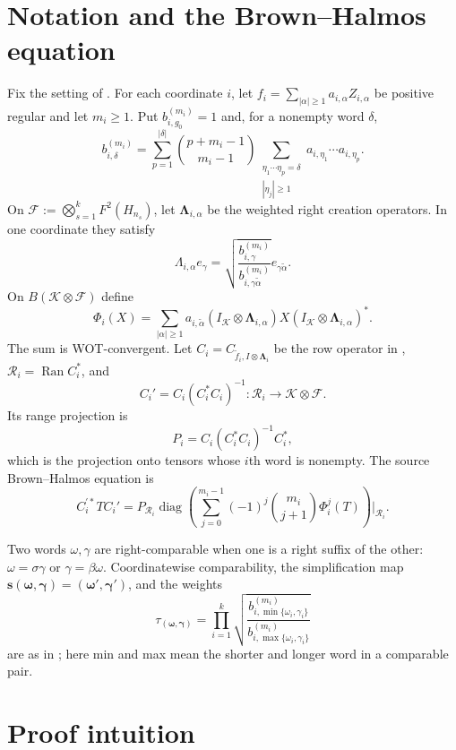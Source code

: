 \documentclass[11pt]{article}
\newcommand{\cK}{\mathcal K}
\newcommand{\cF}{\mathcal F}
\newcommand{\cR}{\mathcal R}
\DeclareMathOperator{\ran}{Ran}
\begin{document}
\section*{Notation and the Brown--Halmos equation}

Fix the setting of \cite[Sections 1 and 4]{Popescu}.  For each coordinate $i$, let
$f_i=\sum_{|\alpha|\geq1}a_{i,\alpha}Z_{i,\alpha}$ be positive regular and let $m_i\geq1$.  Put $b_{i,g_0}^{(m_i)}=1$ and, for a nonempty word $\delta$,
\[
b_{i,\delta}^{(m_i)}
=\sum_{p=1}^{|\delta|}\binom{p+m_i-1}{m_i-1}
  \sum_{\substack{\eta_1\cdots\eta_p=\delta\\ |\eta_j|\geq1}}
  a_{i,\eta_1}\cdots a_{i,\eta_p}.                                 \tag{3}
\]
On $\cF:=\bigotimes_{s=1}^kF^2(H_{n_s})$, let $\boldsymbol\Lambda_{i,\alpha}$ be the weighted right creation operators.  In one coordinate they satisfy
\[
 \Lambda_{i,\alpha}e_\gamma
 =\sqrt{\frac{b_{i,\gamma}^{(m_i)}}
                   {b_{i,\gamma\widetilde\alpha}^{(m_i)}}}
   e_{\gamma\widetilde\alpha}.
\]
On $B(\cK\otimes\cF)$ define
\[
 \Phi_i(X)=\sum_{|\alpha|\geq1}a_{i,\widetilde\alpha}
 (I_{\cK}\otimes\boldsymbol\Lambda_{i,\alpha})X
 (I_{\cK}\otimes\boldsymbol\Lambda_{i,\alpha})^* .                \tag{4}
\]
The sum is WOT-convergent.  Let $C_i=C_{\widetilde f_i,I\otimes\boldsymbol\Lambda_i}$ be the row operator in \cite[Section 4]{Popescu}, $\cR_i=\ran C_i^*$, and
\[
 C_i'=C_i(C_i^*C_i)^{-1}:\cR_i\longrightarrow\cK\otimes\cF.
\]
Its range projection is
\[
 P_i=C_i(C_i^*C_i)^{-1}C_i^*,                                      \tag{5}
\]
which is the projection onto tensors whose $i$th word is nonempty.  The source Brown--Halmos equation is
\[
 C_i^{\prime *}TC_i'
 =P_{\cR_i}\operatorname{diag}
 \left(\sum_{j=0}^{m_i-1}(-1)^j\binom{m_i}{j+1}\Phi_i^j(T)\right)
 \big|_{\cR_i}.                                                     \tag{BH$_i$}
\]

Two words $\omega,\gamma$ are right-comparable when one is a right suffix of the other: $\omega=\sigma\gamma$ or $\gamma=\beta\omega$.  Coordinatewise comparability, the simplification map $\mathbf s(\boldsymbol\omega,\boldsymbol\gamma)=(\boldsymbol\omega',\boldsymbol\gamma')$, and the weights
\[
 \tau_{(\boldsymbol\omega,\boldsymbol\gamma)}
 =\prod_{i=1}^k
 \sqrt{\frac{b_{i,\min\{\omega_i,\gamma_i\}}^{(m_i)}}
              {b_{i,\max\{\omega_i,\gamma_i\}}^{(m_i)}}}          \tag{6}
\]
are as in \cite[Definition 1.2]{Popescu}; here min and max mean the shorter and longer word in a comparable pair.

\section*{Proof intuition}
\end{document}
